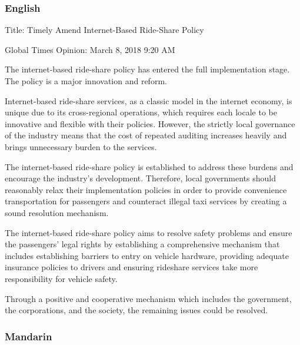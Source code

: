 \documentclass[11pt]{article}
\begin{document}
\subsubsection{English}

Title: Timely Amend Internet-Based Ride-Share Policy\newline

\noindent Global Times Opinion: March 8, 2018 9:20 AM\newline

The internet-based ride-share policy has entered the full implementation stage. The policy is a major innovation and reform.

Internet-based ride-share services, as a classic model in the internet economy, is unique due to its cross-regional operations, which requires each locale to be innovative and flexible with their policies. However, the strictly local governance of the industry means that the cost of repeated auditing increases heavily and brings unnecessary burden to the services.

The internet-based ride-share policy is established to address these burdens and encourage the industry’s development. Therefore, local governments should reasonably relax their implementation policies in order to provide convenience transportation for passengers and counteract illegal taxi services by creating a sound resolution mechanism.

The internet-based ride-share policy aims to resolve safety problems and ensure the passengers’ legal rights by establishing a comprehensive mechanism that includes establishing barriers to entry on vehicle hardware, providing adequate insurance policies to drivers and ensuring rideshare services take more responsibility for vehicle safety.

Through a positive and cooperative mechanism which includes the government, the corporations, and the society, the remaining issues could be resolved.

\subsubsection{Mandarin}
\end{document}
